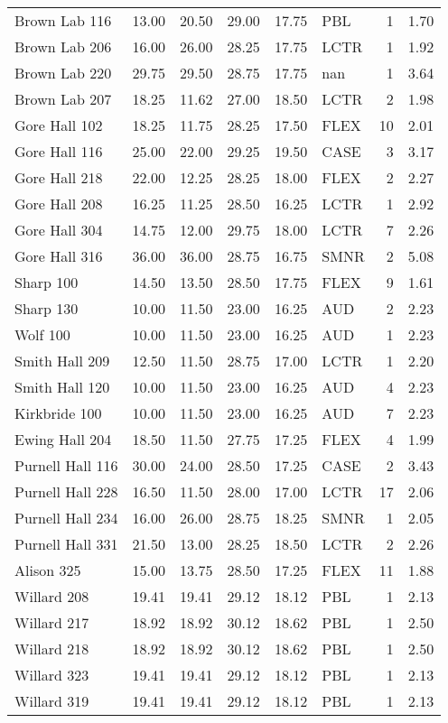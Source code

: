 \begin{tabular}{lrrrrlrr}
Brown Lab 116 & 13.00 & 20.50 & 29.00 & 17.75 & PBL & 1 & 1.70 \\
Brown Lab 206 & 16.00 & 26.00 & 28.25 & 17.75 & LCTR & 1 & 1.92 \\
Brown Lab 220 & 29.75 & 29.50 & 28.75 & 17.75 & nan & 1 & 3.64 \\
Brown Lab 207 & 18.25 & 11.62 & 27.00 & 18.50 & LCTR & 2 & 1.98 \\
Gore Hall 102 & 18.25 & 11.75 & 28.25 & 17.50 & FLEX & 10 & 2.01 \\
Gore Hall 116 & 25.00 & 22.00 & 29.25 & 19.50 & CASE & 3 & 3.17 \\
Gore Hall 218 & 22.00 & 12.25 & 28.25 & 18.00 & FLEX & 2 & 2.27 \\
Gore Hall 208 & 16.25 & 11.25 & 28.50 & 16.25 & LCTR & 1 & 2.92 \\
Gore Hall 304 & 14.75 & 12.00 & 29.75 & 18.00 & LCTR & 7 & 2.26 \\
Gore Hall 316 & 36.00 & 36.00 & 28.75 & 16.75 & SMNR & 2 & 5.08 \\
Sharp 100 & 14.50 & 13.50 & 28.50 & 17.75 & FLEX & 9 & 1.61 \\
Sharp 130 & 10.00 & 11.50 & 23.00 & 16.25 & AUD & 2 & 2.23 \\
Wolf 100 & 10.00 & 11.50 & 23.00 & 16.25 & AUD & 1 & 2.23 \\
Smith Hall 209 & 12.50 & 11.50 & 28.75 & 17.00 & LCTR & 1 & 2.20 \\
Smith Hall 120 & 10.00 & 11.50 & 23.00 & 16.25 & AUD & 4 & 2.23 \\
Kirkbride 100 & 10.00 & 11.50 & 23.00 & 16.25 & AUD & 7 & 2.23 \\
Ewing Hall 204 & 18.50 & 11.50 & 27.75 & 17.25 & FLEX & 4 & 1.99 \\
Purnell Hall 116 & 30.00 & 24.00 & 28.50 & 17.25 & CASE & 2 & 3.43 \\
Purnell Hall 228 & 16.50 & 11.50 & 28.00 & 17.00 & LCTR & 17 & 2.06 \\
Purnell Hall 234 & 16.00 & 26.00 & 28.75 & 18.25 & SMNR & 1 & 2.05 \\
Purnell Hall 331 & 21.50 & 13.00 & 28.25 & 18.50 & LCTR & 2 & 2.26 \\
Alison 325 & 15.00 & 13.75 & 28.50 & 17.25 & FLEX & 11 & 1.88 \\
Willard 208 & 19.41 & 19.41 & 29.12 & 18.12 & PBL & 1 & 2.13 \\
Willard 217 & 18.92 & 18.92 & 30.12 & 18.62 & PBL & 1 & 2.50 \\
Willard 218 & 18.92 & 18.92 & 30.12 & 18.62 & PBL & 1 & 2.50 \\
Willard 323 & 19.41 & 19.41 & 29.12 & 18.12 & PBL & 1 & 2.13 \\
Willard 319 & 19.41 & 19.41 & 29.12 & 18.12 & PBL & 1 & 2.13 \\
\end{tabular}
